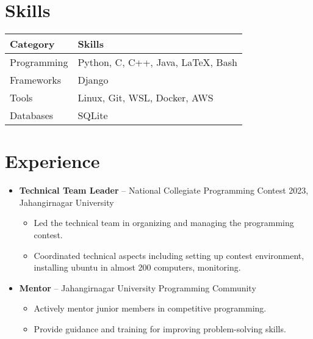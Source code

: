 \documentclass[a4paper,10pt]{article}
\begin{document}
\section*{Skills}

\begin{table}[h!]
    \centering
    \renewcommand{\arraystretch}{1.4} %
    \setlength{\arrayrulewidth}{1pt} %

    \begin{tabularx}{\textwidth}{|>{\raggedright\arraybackslash}m{3cm}|>{\raggedright\arraybackslash}X|}
        \hline
        \rowcolor{primary} \textbf{\color{white} Category} & \textbf{\color{white} Skills} \\
        \hline
        \rowcolor{background} Programming & Python, C, C++, Java, LaTeX, Bash \\
        \hline
        Frameworks & Django \\
        \hline
        \rowcolor{background} Tools & Linux, Git, WSL, Docker, AWS \\
        \hline
        Databases & SQLite \\
        \hline
    \end{tabularx}
\end{table}
\section*{Experience}
\begin{itemize}[leftmargin=0.5cm]
    \item \textbf{Technical Team Leader} – National Collegiate Programming Contest 2023, Jahangirnagar University
    \begin{itemize}
        \item Led the technical team in organizing and managing the programming contest.
        \item Coordinated technical aspects including setting up contest environment, installing ubuntu in almost 200 computers, monitoring.
    \end{itemize}
    \item \textbf{Mentor} – Jahangirnagar University Programming Community
    \begin{itemize}
        \item Actively mentor junior members in competitive programming.
        \item Provide guidance and training for improving problem-solving skills.
    \end{itemize}
\end{itemize}
\end{document}
